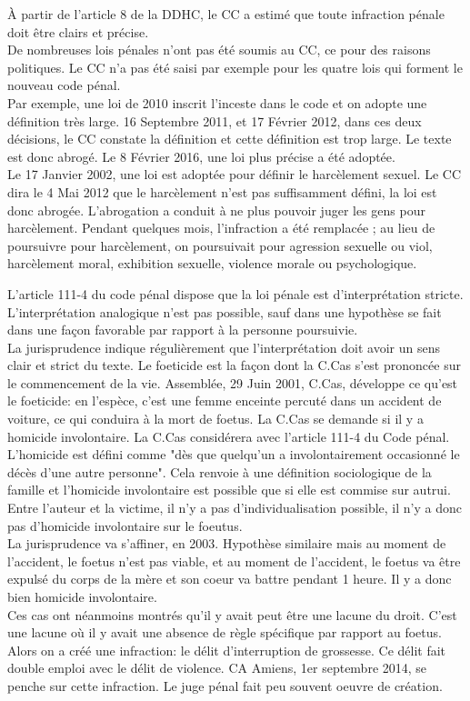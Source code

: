 \documentclass[10pt, a4paper, openany]{book}
\begin{document}
À partir de l'article 8 de la DDHC, le CC a estimé que toute infraction pénale doit être clairs et précise. \\
De nombreuses lois pénales n'ont pas été soumis au CC, ce pour des raisons politiques. Le CC n'a pas été saisi par exemple pour les quatre lois qui forment le nouveau code pénal. \\
Par exemple, une loi de 2010 inscrit l'inceste dans le code et on adopte une définition très large. 16 Septembre 2011, et 17 Février 2012, dans ces deux décisions, le CC constate la définition et cette définition est trop large. Le texte est donc abrogé. Le 8 Février 2016, une loi plus précise a été adoptée. \\
Le 17 Janvier 2002, une loi est adoptée pour définir le harcèlement sexuel. Le CC dira le 4 Mai 2012 que le harcèlement n'est pas suffisamment défini, la loi est donc abrogée. L'abrogation a conduit à ne plus pouvoir juger les gens pour harcèlement. Pendant quelques mois, l'infraction a été remplacée ; au lieu de poursuivre pour harcèlement, on poursuivait pour agression sexuelle ou viol, harcèlement moral, exhibition sexuelle, violence morale ou psychologique.


L'article 111-4 du code pénal dispose que la loi pénale est d'interprétation stricte. L'interprétation analogique n'est pas possible, sauf dans une hypothèse se fait dans une façon favorable par rapport à la personne poursuivie. \\
La jurisprudence indique régulièrement que l'interprétation doit avoir un sens clair et strict du texte. Le foeticide est la façon dont la C.Cas s'est prononcée sur le commencement de la vie. Assemblée, 29 Juin 2001, C.Cas, développe ce qu'est le foeticide: en l'espèce, c'est une femme enceinte percuté dans un accident de voiture, ce qui conduira à la mort de foetus. La C.Cas se demande si il y a homicide involontaire. La C.Cas considérera avec l'article 111-4 du Code pénal. L'homicide est défini comme "dès que quelqu'un a involontairement occasionné le décès d'une autre personne". Cela renvoie à une définition sociologique de la famille et l'homicide involontaire est possible que si elle est commise sur autrui. Entre l'auteur et la victime, il n'y a pas d'individualisation possible, il n'y a donc pas d'homicide involontaire sur le foeutus. \\
La jurisprudence va s'affiner, en 2003. Hypothèse similaire mais au moment de l'accident, le foetus n'est pas viable, et au moment de l'accident, le foetus va être expulsé du corps de la mère et son coeur va battre pendant 1 heure. Il y a donc bien homicide involontaire. \\
Ces cas ont néanmoins montrés qu'il y avait peut être une lacune du droit. C'est une lacune où il y avait une absence de règle spécifique par rapport au foetus. Alors on a créé une infraction: le délit d'interruption de grossesse. Ce délit fait double emploi avec le délit de violence. CA Amiens, 1er septembre 2014, se penche sur cette infraction. Le juge pénal fait peu souvent oeuvre de création. 
\end{document}
